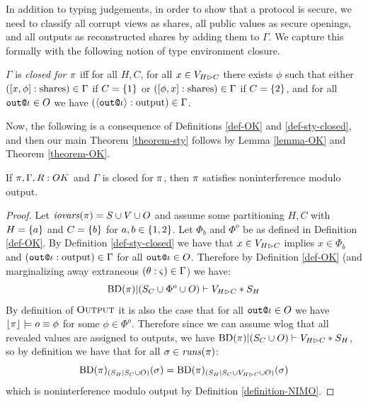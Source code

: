 In addition to typing judgements, in order to show that a protocol is
secure, we need to classify all corrupt views as shares, all
public values as secure openings, and all outputs as reconstructed
shares by adding them to $\Gamma$. We capture this formally with the following notion of
type environment closure.
\begin{definition}
  \label{def-sty-closed}
  $\Gamma$ is \emph{closed for $\pi$} iff for all $H,C$,
  for all $x \in V_{H \rhd C}$ there exists $\phi$ such that either
  $([x,\phi] : \mathrm{shares}) \in \Gamma$ if $C = \{ 1 \}$
  or  $([\phi,x] : \mathrm{shares}) \in \Gamma$ if $C = \{ 2 \}$,
  and for all $\texttt{out}\texttt{@}\iota \in O$ we have $(\langle \texttt{out}\texttt{@}\iota \rangle : \mathrm{output}) \in \Gamma$.
\end{definition}
Now, the following is a consequence of Definitions \ref{def-OK} and \ref{def-sty-closed}, and then
our main Theorem \ref{theorem-sty} follows by Lemma \ref{lemma-OK} and Theorem \ref{theorem-OK}.
\begin{theorem}
  \label{theorem-OK}
  If $\pi,\Gamma,R : {OK}$ and $\Gamma$ is closed
  for $\pi$, then $\pi$ satisfies noninterference modulo output. 
\end{theorem}
\begin{proof}
  Let $\mathit{iovars}(\pi) = S \cup V \cup O$ and assume some partitioning $H,C$
  with $H = \{ a \}$ and $C = \{ b \}$ for $a,b \in \{ 1,2 \}$.
  Let $\Phi_b$ and $\Phi^o$ be as defined in Definition \ref{def-OK}. 
  By Definition \ref{def-sty-closed} we have that $x \in V_{H \rhd C}$
  implies $x \in \Phi_b$ and $(\texttt{out}\texttt{@}\iota : \mathrm{output}) \in \Gamma$ for all
  $\texttt{out}\texttt{@}\iota \in O$. 
  Therefore by Definition \ref{def-OK} (and marginalizing away
  extraneous $(\theta : \varsigma) \in \Gamma$) we have:
  $$
  \mathrm{BD}(\pi)|(S_C \cup \Phi^o \cup O) \vdash V_{H \rhd C} * S_H
  $$
  By definition of $\text{\sc Output}$ it is also the case that for all
  $\texttt{out}\texttt{@}\iota \in O$ we have $\lfloor \pi \rfloor \models o \equiv \phi$ for some
  $\phi \in \Phi^o$. Therefore since we can assume wlog that all revealed
  values are assigned to outputs, we have
  $
  \mathrm{BD}(\pi)|(S_C \cup O) \vdash V_{H \rhd C} * S_H
  $,
  so by definition we have that for all $\sigma \in \mathit{runs}(\pi)$: 
  $$
  \mathrm{BD}(\pi)_{({S_H}|{S_C \cup O})}(\sigma) = \mathrm{BD}(\pi)_{({S_H}|{S_C \cup V_{H \rhd C} \cup O})}(\sigma)
  $$
  which is noninterference modulo output by Definition \ref{definition-NIMO}.
\end{proof}

